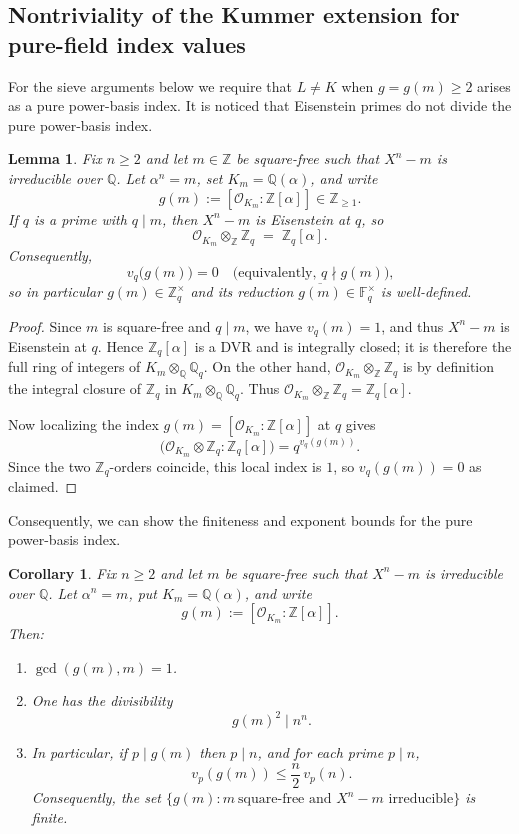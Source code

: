 \documentclass[11pt,letterpaper]{amsart}
\newcommand{\Z}{\mathbb{Z}}
\newcommand{\Q}{\mathbb{Q}}
\newcommand{\F}{\mathbb{F}}
\newcommand{\Ocal}{\mathcal{O}}
\newcommand{\OO}{\mathcal{O}}
\theoremstyle{plain}
\newtheorem{lemma}[theorem]{Lemma}
\newtheorem{corollary}[theorem]{Corollary}
\theoremstyle{definition}
\theoremstyle{remark}
\theoremstyle{plain}
\begin{document}
\subsection{Nontriviality of the Kummer extension for pure-field index values}
\label{sec:kummer-nontrivial-index}

For the sieve arguments below we require that $L\neq K$ when $g=g(m)\ge 2$
arises as a pure power-basis index. It is noticed that Eisenstein primes do not divide the pure power-basis index.

\begin{lemma}
\label{lem:eisenstein-prime-does-not-divide-g}
Fix $n\ge 2$ and let $m\in\Z$ be square-free such that $X^n-m$ is irreducible over $\Q$.
Let $\alpha^n=m$, set $K_m=\Q(\alpha)$, and write
\[
g(m):=[\OO_{K_m}:\Z[\alpha]]\in\Z_{\ge 1}.
\]
If $q$ is a prime with $q\mid m$, then $X^n-m$ is Eisenstein at $q$, so
\[
\OO_{K_m}\otimes_\Z \Z_q \;=\; \Z_q[\alpha].
\]
Consequently,
\[
v_q\bigl(g(m)\bigr)=0
\quad\text{(equivalently, $q\nmid g(m)$),}
\]
so in particular $g(m)\in\Z_q^\times$ and its reduction $\overline{g(m)}\in\F_q^\times$ is well-defined.
\end{lemma}

\begin{proof}
Since $m$ is square-free and $q\mid m$, we have $v_q(m)=1$, and thus $X^n-m$ is Eisenstein at $q$.
Hence $\Z_q[\alpha]$ is a DVR and is integrally closed; it is therefore the full ring of integers of
$K_m\otimes_\Q \Q_q$. On the other hand, $\OO_{K_m}\otimes_\Z\Z_q$ is by definition the integral closure
of $\Z_q$ in $K_m\otimes_\Q\Q_q$. Thus $\OO_{K_m}\otimes_\Z\Z_q=\Z_q[\alpha]$.

Now localizing the index $g(m)=[\OO_{K_m}:\Z[\alpha]]$ at $q$ gives
\[
\bigl(\OO_{K_m}\otimes\Z_q : \Z_q[\alpha]\bigr)=q^{v_q(g(m))}.
\]
Since the two $\Z_q$-orders coincide, this local index is $1$, so $v_q(g(m))=0$ as claimed.
\end{proof}

Consequently, we can show the finiteness and exponent bounds for the pure power-basis index.
\begin{corollary}
\label{cor:finite-g}
Fix $n\ge 2$ and let $m$ be square-free such that $X^n-m$ is irreducible over $\Q$.
Let $\alpha^n=m$, put $K_m=\Q(\alpha)$, and write
\[
g(m):=[\Ocal_{K_m}:\Z[\alpha]].
\]
Then:
\begin{enumerate}[label=\textup{(\roman*)},leftmargin=*]
\item $\gcd(g(m),m)=1$.
\item One has the divisibility
\[
g(m)^2 \mid n^n.
\]
\item In particular, if $p\mid g(m)$ then $p\mid n$, and for each prime $p\mid n$,
\[
v_p(g(m))\le \frac{n}{2}\,v_p(n).
\]
Consequently, the set $\{g(m): m\ \text{square-free and }X^n-m\text{ irreducible}\}$ is finite.
\end{enumerate}
\end{corollary}
\end{document}
